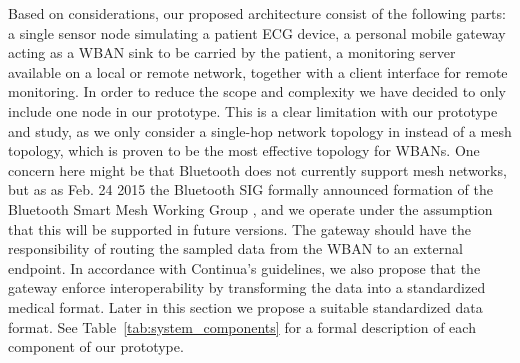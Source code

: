 Based on considerations, our proposed architecture consist of the following parts: a single sensor node simulating a patient ECG device, a personal mobile gateway acting as a WBAN sink to be carried by the patient, a monitoring server available on a local or remote network, together with a client interface for remote monitoring. In order to reduce the scope and complexity we have decided to only include one node in our prototype. This is a clear limitation with our prototype and study, as we only consider a single-hop network topology in instead of a mesh topology, which is proven to be the most effective topology for WBANs. One concern here might be that Bluetooth does not currently support mesh networks, but as as Feb. 24 2015 the Bluetooth SIG formally announced formation of the Bluetooth Smart Mesh Working Group \cite{bt_sig_mesh}, and we operate under the assumption that this will be supported in future versions. The gateway should have the responsibility of routing the sampled data from the WBAN to an external endpoint. In accordance with Continua's guidelines, we also propose that the gateway enforce interoperability by transforming the data into a standardized medical format. Later in this section we propose a suitable  standardized data format. See Table~\ref{tab:system_components} for a formal description of each component of our prototype.


